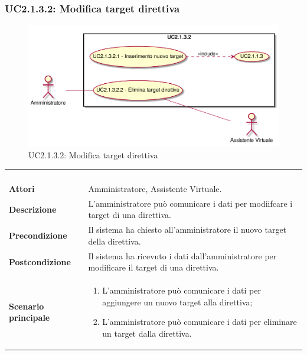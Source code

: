 \newpage\subsubsection{UC2.1.3.2: Modifica target direttiva}
\label{UC2.1.3.2}
\begin{figure}[h]
	\centering
	\includegraphics[width=\textwidth,height=\textheight,keepaspectratio]{images/UseCaseUC2132.png}
	\caption{UC2.1.3.2: Modifica target direttiva}
\end{figure}
\begin{longtable}{l|p{10cm}}
	\rowcolor[gray]{0.8} \multicolumn{2}{c}{} \\
	\rowcolor[gray]{0.8} \multicolumn{2}{c}{\textbf{UC2.1.3.2 - Modifica target direttiva}} \\
	\rowcolor[gray]{0.8} \multicolumn{2}{c}{} \\
	\hline
	&\\
	\textbf{Attori} & Amministratore, Assistente Virtuale.\\[7pt]
	\textbf{Descrizione} & L'amministratore può comunicare i dati per modiifcare i target di una direttiva.\\[7pt]
	\textbf{Precondizione} & Il sistema ha chiesto all'amministratore il nuovo target della direttiva.\\[7pt]
	\textbf{Postcondizione} & Il sistema ha ricevuto i dati dall'amministratore per modificare il target di una direttiva.\\[7pt]
	\textbf{Scenario principale} &\begin{enumerate}
		\item  L'amministratore può comunicare i dati per aggiungere un nuovo target alla direttiva;
		\item  L'amministratore può comunicare i dati per eliminare un target dalla direttiva.
	\end{enumerate}
	\\[7pt]\hline
\end{longtable}

